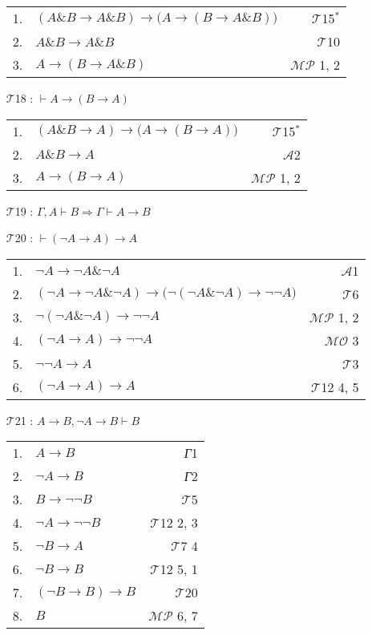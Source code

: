 \documentclass{article}
\begin{document}
\begin{itemize}
\begin{tabular}{llr}
1. & $\left(A\& B\rightarrow A\& B\right)\rightarrow\bigl(A\rightarrow\left(B\rightarrow A\& B\right)\bigr)$ & $\mathcal{T}$15$^*$\\
2. & $A\& B\rightarrow A\& B$ & $\mathcal{T}$10\\
3. & $A\rightarrow\left(B\rightarrow A\& B\right)$ & $\mathcal{MP}$ 1, 2
\end{tabular}
\vfill
\item[$\mathcal{T}$18]: $\vdash A\rightarrow\left(B\rightarrow A\right)$

\begin{tabular}{llr}
1. & $\left(A\& B\rightarrow A\right)\rightarrow\bigl(A\rightarrow\left(B\rightarrow A\right)\bigr)$ & $\mathcal{T}$15$^*$\\
2. & $A\& B\rightarrow A$ & $\mathcal{A}$2\\
3. & $A\rightarrow\left(B\rightarrow A\right)$ & $\mathcal{MP}$ 1, 2
\end{tabular}

\item[$\mathcal{T}$19]: $\Gamma,A\vdash B\Rightarrow\Gamma\vdash A\rightarrow B$
\item[$\mathcal{T}$20]: $\vdash\left(\neg A\rightarrow A\right)\rightarrow A$

\begin{tabular}{llr}
1. & $\neg A\rightarrow\neg A\&\neg A$ & $\mathcal{A}$1\\
2. & $\left(\neg A\rightarrow\neg A\&\neg A\right)\rightarrow\bigl(\neg\left(\neg A\&\neg A\right)\rightarrow\neg\neg A\bigr)$ & $\mathcal{T}$6\\
3. & $\neg\left(\neg A\&\neg A\right)\rightarrow\neg\neg A$ & $\mathcal{MP}$ 1, 2\\
4. & $\left(\neg A\rightarrow A\right)\rightarrow\neg\neg A$ & $\mathcal{MO}$ 3\\
5. & $\neg\neg A\rightarrow A$ & $\mathcal{T}$3\\
6. & $\left(\neg A\rightarrow A\right)\rightarrow A$ & $\mathcal{T}$12 4, 5
\end{tabular}
\item[$\mathcal{T}$21]: $A\rightarrow B,\neg A\rightarrow B\vdash B$

\begin{tabular}{llr}
1. & $A\rightarrow B$ & \textit{Г}1\\
2. & $\neg A\rightarrow B$ & \textit{Г}2\\
3. & $B\rightarrow\neg\neg B$ & $\mathcal{T}$5\\
4. & $\neg A\rightarrow\neg\neg B$ & $\mathcal{T}$12 2, 3\\
5. & $\neg B\rightarrow A$ & $\mathcal{T}$7 4\\
6. & $\neg B\rightarrow B$ & $\mathcal{T}$12 5, 1\\
7. & $\left(\neg B\rightarrow B\right)\rightarrow B$ & $\mathcal{T}$20\\
8. & $B$ & $\mathcal{MP}$ 6, 7
\end{tabular}
\end{itemize}
\end{document}
